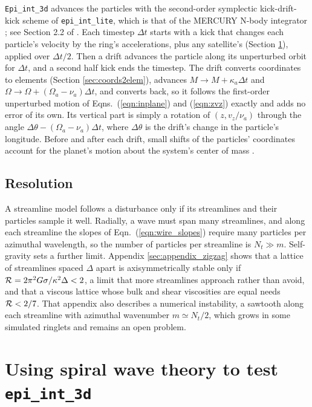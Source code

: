\documentclass[twocolumn]{aastex702}
\newcommand{\code}[1]{\texttt{#1}}   %
\begin{document}
\code{Epi\_int\_3d} advances the particles with the second-order symplectic kick-drift-kick scheme of
\code{epi\_int\_lite}, which is that of the MERCURY N-body integrator \citep{C99}; see Section 2.2 of
\cite{H25}. Each timestep $\Delta t$ starts with a kick that changes each particle's velocity by the
ring's accelerations, plus any satellite's (Section \ref{sec:waves}), applied over $\Delta t/2$. Then a
drift advances the particle along its unperturbed orbit for $\Delta t$, and a second half kick ends the
timestep. The drift converts coordinates to elements (Section \ref{sec:coords2elem}), advances
$M \rightarrow M + \kappa_a\Delta t$ and $\Omega \rightarrow \Omega + (\Omega_a - \nu_a)\Delta t$, and
converts back, so it follows the first-order unperturbed motion of Eqns.\ (\ref{eqn:inplane}) and (\ref{eqn:zvz})
exactly and adds no error of its own.
Its vertical part is simply a rotation of $(z, v_z/\nu_a)$ through the angle $\Delta\theta - (\Omega_a - \nu_a)\Delta t$,
where $\Delta\theta$ is the drift's change in the particle's longitude. Before and after each drift, small shifts of the
particles' coordinates account for the planet's motion about the system's center of mass \citep{C99}.

\subsection{Resolution}
\label{sec:resolution}

A streamline model follows a disturbance only if its streamlines and their particles sample it well. Radially, a wave
must span many streamlines, and along each streamline the slopes of Eqn.\ (\ref{eqn:wire_slopes}) require many
particles per azimuthal wavelength, so the number of particles per streamline is $N_t \gg m$. Self-gravity sets a
further limit. Appendix \ref{sec:appendix_zigzag} shows that a lattice of streamlines spaced $\Delta$ apart is
axisymmetrically stable only if ${\cal R} = 2\pi^2G\sigma/\kappa^2\Delta < 2$, a limit that more streamlines approach
rather than avoid, and that a viscous lattice whose bulk and shear viscosities are equal needs ${\cal R} < 2/7$. That
appendix also describes a numerical instability, a sawtooth along each streamline with azimuthal wavenumber
$m \simeq N_t/2$, which grows in some simulated ringlets and remains an open problem.


\section{Using spiral wave theory to test \code{epi\_int\_3d}}
\label{sec:waves}
\end{document}
